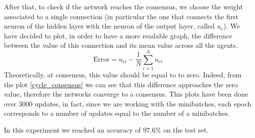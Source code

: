 \documentclass[a4paper,11pt,oneside]{book}
\begin{document}
\bigskip

After that, to check if the network reaches the consensus, we choose the weight associated to a single connection (in particular the one that connects the first neuron of the hidden layer with the neuron of the output layer, called $u_c$). We have decided to plot, in order to have a more readable graph, the difference between the value of this connection and its mean value across all the agents.
\begin{equation}
\text{Error} = u_{ci} - \frac{1}{N}\sum_{i=1}^N u_{ci}
\end{equation}
Theoretically, at consensus, this value should be equal to to zero. Indeed, from the plot \ref{cycle_consensus} we can see that this difference approaches the zero value, therefore the networks converge to a consensus.  This plots have been done over $3000$ updates, in fact, since we are working with the minibatches, each epoch corresponds to a number of updates equal to the number of a minibatches.

\bigskip
In this experiment we reached an accuracy of $97.6\%$ on the test set.
\end{document}
